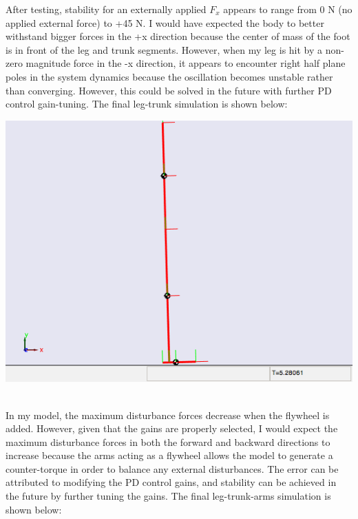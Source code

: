 \documentclass{article}
\begin{document}
After testing, stability for an externally applied $F_x$ appears to range from 0 N (no applied external force) to +45 N. I would have expected the body to better withstand bigger forces in the +x direction because the center of mass of the foot is in front of the leg and trunk segments. However, when my leg is hit by a non-zero magnitude force in the -x direction, it appears to encounter right half plane poles in the system dynamics because the oscillation becomes unstable rather than converging. However, this could be solved in the future with further PD control gain-tuning. The final leg-trunk simulation is shown below:

\begin{center}
\includegraphics[scale=0.75]{1b_leg.png}
\end{center}

\\

In my model, the maximum disturbance forces decrease when the flywheel is added. However, given that the gains are properly selected, I would expect the maximum disturbance forces in both the forward and backward directions to increase because the arms acting as a flywheel allows the model to generate a counter-torque in order to balance any external disturbances. The error can be attributed to modifying the PD control gains, and stability can be achieved in the future by further tuning the gains. The final leg-trunk-arms simulation is shown below:
\end{document}
